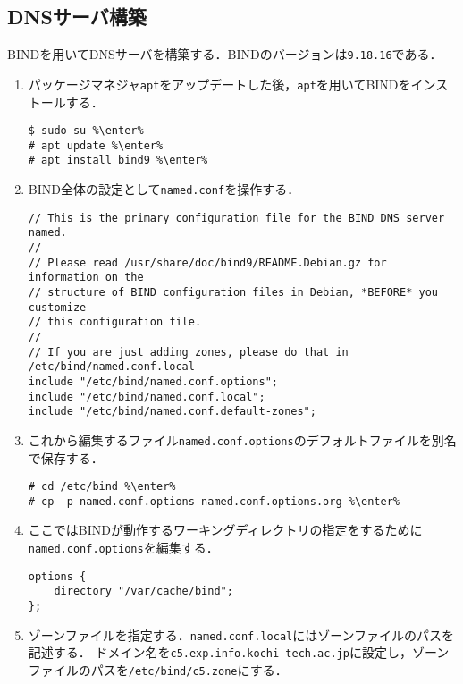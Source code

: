 \subsection{DNSサーバ構築}
BINDを用いてDNSサーバを構築する．BINDのバージョンは\texttt{9.18.16}である．
\newcommand{\enter}{\ovalbox{Enter⏎}}
\begin{enumerate}
    \renewcommand{\labelenumi}{\textbf{\theenumi.}\ }
    \item パッケージマネジャ\texttt{apt}をアップデートした後，\texttt{apt}を用いてBINDをインストールする．
          \begin{lstlisting}
$ sudo su %\enter%
# apt update %\enter%
# apt install bind9 %\enter%
    \end{lstlisting}
    \item BIND全体の設定として\texttt{named.conf}を操作する．
          \begin{lstlisting}[caption={\ttfamily /etc/bind/named.conf},style=file]
// This is the primary configuration file for the BIND DNS server named.
//
// Please read /usr/share/doc/bind9/README.Debian.gz for information on the
// structure of BIND configuration files in Debian, *BEFORE* you customize
// this configuration file.
//
// If you are just adding zones, please do that in /etc/bind/named.conf.local
include "/etc/bind/named.conf.options";
include "/etc/bind/named.conf.local";
include "/etc/bind/named.conf.default-zones";
\end{lstlisting}
    \item これから編集するファイル\texttt{named.conf.options}のデフォルトファイルを別名で保存する．
          \begin{lstlisting}
# cd /etc/bind %\enter%
# cp -p named.conf.options named.conf.options.org %\enter%
\end{lstlisting}
    \item ここではBINDが動作するワーキングディレクトリの指定をするために\texttt{named.conf.options}を編集する．
          \begin{lstlisting}[caption={\ttfamily /etc/bind/named.conf.options},style=file]
options {
    directory "/var/cache/bind";
};
\end{lstlisting}
    \item ゾーンファイルを指定する．\texttt{named.conf.local}にはゾーンファイルのパスを記述する．
          ドメイン名を\texttt{c5.exp.info.kochi-tech.ac.jp}に設定し，ゾーンファイルのパスを\texttt{/etc/bind/c5.zone}にする．
          \begin{lstlisting}[style=file,caption={\ttfamily /etc/bind/named.conf.local}]

\end{lstlisting}
\end{enumerate}
